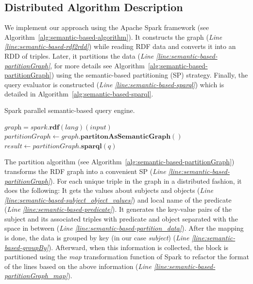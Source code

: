 \subsection{Distributed Algorithm Description}
\label{subsection:semantic-based-algorithm}
We implement our approach using the Apache Spark framework (see Algorithm~\ref{alg:semantic-based-algorithm}). 
It constructs the graph (\textit{Line \ref{line:semantic-based-rdf2rdd}}) while reading \gls{RDF} data and converts it into an \gls{RDD} of triples.
Later, it partitions the data (\textit{Line \ref{line:semantic-based-partitionGraph}}, for more details see Algorithm~\ref{alg:semantic-based-partitionGraph}) using the semantic-based partitioning (SP) strategy.
Finally, the query evaluator is constructed (\textit{Line \ref{line:semantic-based-sparql}}) which is detailed in Algorithm~\ref{alg:semantic-based-sparql}.

\begin{algorithm*}
\caption{Spark parallel semantic-based query engine.}
\label{alg:semantic-based-algorithm}
    $\textit{graph} = spark.\textbf{rdf}(lang)(input)$ \label{line:semantic-based-rdf2rdd}\\
    $partitionGraph \leftarrow graph.\textbf{partitonAsSemanticGraph}()$ \label{line:semantic-based-partitionGraph}\\
    $result \leftarrow partitionGraph.\textbf{sparql}(q)$ \label{line:semantic-based-sparql}\\
\end{algorithm*}

The partition algorithm (see Algorithm~\ref{alg:semantic-based-partitionGraph}) transforms the \gls{RDF} graph into a convenient SP (\textit{Line \ref{line:semantic-based-partitionGraph}}).
For each unique triple in the graph in a distributed fashion, it does the following: It gets the values about subjects and objects (\textit{Line \ref{line:semantic-based-subject_object_values}}) and local name of the predicate (\textit{Line \ref{line:semantic-based-predicate}}).
It generates the key-value pairs of the subject and its associated triples with predicate and object separated with the space in between (\textit{Line \ref{line:semantic-based-partition_data}}).
After the mapping is done, the data is grouped by key (in our case \emph{subject}) (\textit{Line \ref{line:semantic-based-groupBy}}).
Afterward, when this information is collected, the block is partitioned using the \emph{map} transformation function of Spark to refactor the format of the lines based on the above information (\textit{Line \ref{line:semantic-based-partitionGraph_map}}).

